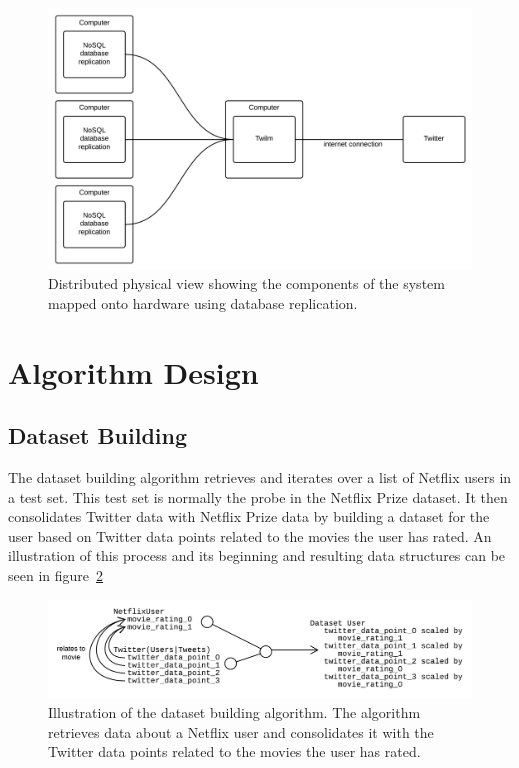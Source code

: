 \begin{figure}[H]
\centerline{\includegraphics[width=4.5in]{image/architecture-physical-view-distributed.png}}
\caption[Distributed Physical View]{Distributed physical view showing the components of the system mapped onto hardware using database replication.}
\label{figure:distr-phys-view}
\end{figure}

\section{Algorithm Design}
\subsection{Dataset Building}\label{algorithm-design:dataset-building}
The dataset building algorithm retrieves and iterates over a list of Netflix users in a test set. This test set is normally the probe in the Netflix Prize dataset. It then consolidates Twitter data with Netflix Prize data by building a dataset for the user based on Twitter data points related to the movies the user has rated. An illustration of this process and its beginning and resulting data structures can be seen in figure~\ref{figure:dataset-building-algorithm}

\begin{figure}[H]
    \centerline{\includegraphics[width=6in]{image/design-algorithm-dataset-building.png}}
    \caption[Database Building Algorithm]{Illustration of the dataset building algorithm. The algorithm retrieves data about a Netflix user and consolidates it with the Twitter data points related to the movies the user has rated.}
    \label{figure:dataset-building-algorithm}
\end{figure}



